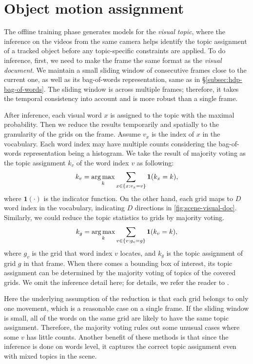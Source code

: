 \section{Object motion assignment}
\label{sec:semantic-inf}

The offline training phase generates models for the \emph{visual topic}, where the inference on the videos from the same camera helps identify the topic assignment of a tracked object before any topic-specific constraints are applied.
To do inference, first, we need to make the frame the same format as the \emph{visual document}.
We maintain a small sliding window of consecutive frames close to the current one, as well as its bag-of-words representation, same as in \S\ref{subsec:hdp-bag-of-words}.  
The sliding window is across multiple frames; therefore, it takes the temporal consistency into account and is more robust than a single frame.

After inference, each visual word $x$ is assigned to the topic with the maximal probability. 
Then we reduce the results temporarily and spatially to the granularity of the grids on the frame.
Assume $v_{x}$ is the index of $x$ in the vocabulary. 
Each word index may have multiple counts considering the bag-of-words representation being a histogram.
We take the result of majority voting as the topic assignment $k_v$ of the word index $v$ as following:
\begin{align}
k_{v} = \operatorname*{arg\,max}_k{\sum_{x\in\{x:v_{x} = v\}}{\mathbf{1}(k_{x} = k)}},
\end{align}
where $\mathbf{1}(\cdot)$ is the indicator function.
On the other hand, each grid maps to $D$ word index in the vocabulary, indicating $D$ directions in \ref{fig:scene-visual-doc}.
Similarly, we could reduce the topic statistics to grids by majority voting.
\begin{align}
k_{g} = \operatorname*{arg\,max}_k{\sum_{v\in\{v:g_{v} = g\}}{\mathbf{1}(k_v = k)}},
\end{align}
where $g_{v}$ is the grid that word index $v$ locates, and $k_g$ is the topic assignment of grid $g$ in that frame.
When there comes a bounding box of interest, its topic assignment can be determined by the majority voting of topics of the covered grids.
We omit the inference detail here; for details, we refer the reader to \cite{yee2006hierarchical}.

Here the underlying assumption of the reduction is that each grid belongs to only one movement, which is a reasonable case on a single frame.
If the sliding window is small, all of the words on the same grid are likely to have the same topic assignment.
Therefore, the majority voting rules out some unusual cases where some $v$ has little counts.
Another benefit of these methods is that since the inference is done on words level, it captures the correct topic assignment even with mixed topics in the scene.